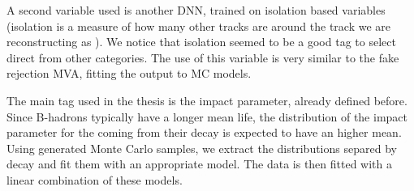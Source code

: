 A second variable used is another DNN, trained on isolation based variables (isolation is a measure of how many other tracks are around the track we are reconstructing as \Pgm).
We notice that isolation seemed to be a good tag to select direct \Pgm from other categories.
The use of this variable is very similar to the fake rejection MVA, fitting the output to MC models.

The main tag used in the thesis is the impact parameter, already defined before. 
Since B-hadrons typically have a longer mean life, the distribution of the impact parameter for the \Pgm coming from their decay is expected to have an higher mean.
Using generated Monte Carlo samples, we extract the distributions separed by decay and fit them with an appropriate model.
The data is then fitted with a linear combination of these models.

